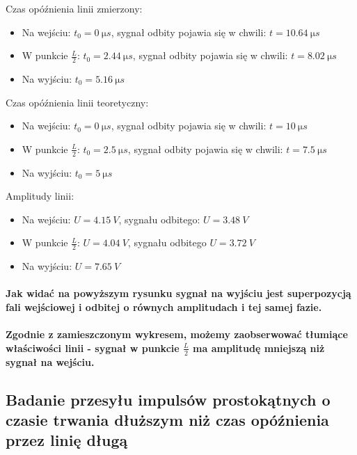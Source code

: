 \documentclass[a4paper,12pt]{article}
\begin{document}
\begin{justify}
Czas opóźnienia linii zmierzony: \\
\begin{itemize}
\item Na wejściu: $t_{0} = \SI{0}{\micro s}$, sygnał odbity pojawia się w chwili: $t = \SI{10.64}{\micro s}$
\item W punkcie $\frac{L}{2}$: $t_{0} = \SI{2.44}{\micro s} $, sygnał odbity pojawia się w chwili: $t = \SI{8.02}{\micro s}$
\item Na wyjściu: $t_{0} = \SI{5.16}{\micro s}$
\end{itemize}

Czas opóźnienia linii teoretyczny: \\
\begin{itemize}
\item Na wejściu: $t_{0} = \SI{0}{\micro s}$, sygnał odbity pojawia się w chwili: $t = \SI{10}{\micro s}$
\item W punkcie $\frac{L}{2}$: $t_{0} = \SI{2.5}{\micro s} $, sygnał odbity pojawia się w chwili: $t = \SI{7.5}{\micro s}$
\item Na wyjściu: $t_{0} = \SI{5}{\micro s}$
\end{itemize}

Amplitudy linii: \\
\begin{itemize}
\item Na wejściu: $U = \SI{4.15}{V}$, sygnału odbitego: $U = \SI{3.48}{V}$
\item W punkcie $\frac{L}{2}$: $U = \SI{4.04}{V} $, sygnału odbitego $U = \SI{3.72}{V}$
\item Na wyjściu: $U = \SI{7.65}{V}$
\end{itemize}

\paragraph{Jak widać na powyższym rysunku sygnał na wyjściu jest superpozycją fali wejściowej i odbitej o równych amplitudach i tej samej fazie. \\ \, \\
Zgodnie z zamieszczonym wykresem, możemy zaobserwować tłumiące właściwości linii - sygnał w punkcie $\frac{L}{2}$ ma amplitudę mniejszą niż sygnał na wejściu.}

\newpage

\subsection{Badanie przesyłu impulsów prostokątnych o czasie trwania dłuższym niż czas opóźnienia  przez linię długą}


\end{justify}
\end{document}
